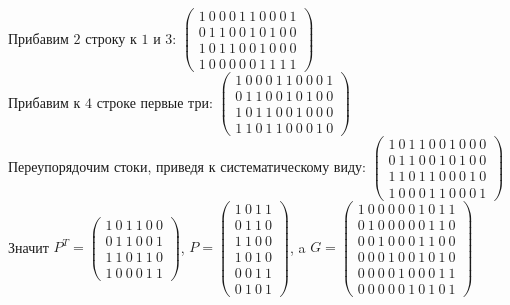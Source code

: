 \documentclass[fontsize=14pt]{article}
\begin{document}
	Прибавим $2$ строку к $1$ и $3$: 
	$
	 \begin{pmatrix}
		1\ 0\ 0\ 0\ 1\ 1\ 0\ 0\ 0\ 1\\
		0\ 1\ 1\ 0\ 0\ 1\ 0\ 1\ 0\ 0\\
		1\ 0\ 1\ 1\ 0\ 0\ 1\ 0\ 0\ 0\\
		1\ 0\ 0\ 0\ 0\ 0\ 1\ 1\ 1\ 1		
	\end{pmatrix}
	$\\

	Прибавим к $4$ строке первые три:
	$
	 \begin{pmatrix}
		1\ 0\ 0\ 0\ 1\ 1\ 0\ 0\ 0\ 1\\
		0\ 1\ 1\ 0\ 0\ 1\ 0\ 1\ 0\ 0\\
		1\ 0\ 1\ 1\ 0\ 0\ 1\ 0\ 0\ 0\\
		1\ 1\ 0\ 1\ 1\ 0\ 0\ 0\ 1\ 0		
	\end{pmatrix}
	$\\
	
	Переупорядочим стоки, приведя к систематическому виду:
	$
	 \begin{pmatrix}
	 	1\ 0\ 1\ 1\ 0\ 0\ 1\ 0\ 0\ 0\\
	 	0\ 1\ 1\ 0\ 0\ 1\ 0\ 1\ 0\ 0\\
	 	1\ 1\ 0\ 1\ 1\ 0\ 0\ 0\ 1\ 0\\
		1\ 0\ 0\ 0\ 1\ 1\ 0\ 0\ 0\ 1		
	\end{pmatrix}
	$
	Значит $P^T = 
	 \begin{pmatrix}
	 	1\ 0\ 1\ 1\ 0\ 0\\
	 	0\ 1\ 1\ 0\ 0\ 1\\
	 	1\ 1\ 0\ 1\ 1\ 0\\
		1\ 0\ 0\ 0\ 1\ 1		
	\end{pmatrix}
	$,
	$P =
	 \begin{pmatrix}
		1\ 0\ 1\ 1\\
		0\ 1\ 1\ 0\\
		1\ 1\ 0\ 0\\
		1\ 0\ 1\ 0\\
		0\ 0\ 1\ 1\\
		0\ 1\ 0\ 1	
	\end{pmatrix}$, a
	$	G = 
	\begin{pmatrix}
		1\ 0\ 0\ 0\ 0\ 0\ 1\ 0\ 1\ 1\\
		0\ 1\ 0\ 0\ 0\ 0\ 0\ 1\ 1\ 0\\
		0\ 0\ 1\ 0\ 0\ 0\ 1\ 1\ 0\ 0\\
		0\ 0\ 0\ 1\ 0\ 0\ 1\ 0\ 1\ 0\\
		0\ 0\ 0\ 0\ 1\ 0\ 0\ 0\ 1\ 1\\
		0\ 0\ 0\ 0\ 0\ 1\ 0\ 1\ 0\ 1	
	\end{pmatrix}
	$\\
	
\end{document}
